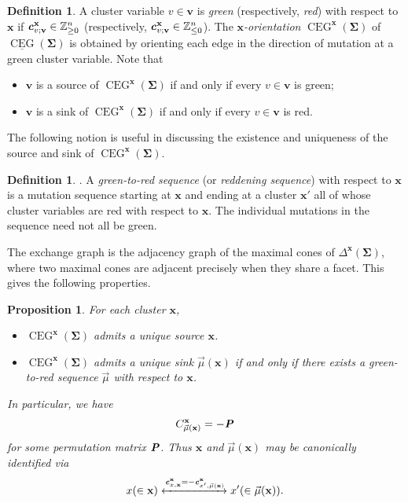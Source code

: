 \documentclass[11pt,reqno]{amsart}
\providecommand{\xlongleftrightarrow}[2][]{\xleftrightarrow[#1]{#2}}
\theoremstyle{plain}
\newtheorem{proposition}[theorem]{Proposition}
\theoremstyle{definition}
\newtheorem{definition}[theorem]{Definition}
\numberwithin{equation}{section}
\newcommand\ZZ{\mathbb{Z}}
\newcommand\<{\langle}
\renewcommand\>{\rangle}
\newcommand{\CEG}{\operatorname{CEG}} %
\newcommand{\uCEG}{\underline{\CEG}} %
\def\vv{\mathbf{v}}
\def\fan{\Delta}
\newcommand{\bfit}[1]{\textbf{\textit{#1}}}
\def\seeds{\mathbf{\Sigma}}
\def\xx{\mathbf{x}}%
\def\cvec{\bfit{c}}
\def\Cmat{{C}}
\newcommand{\DT}[1]{#1^{\vee}}
\def\ZZp{\ZZ_{\ge0}}
\def\ZZm{\ZZ_{\le0}}
\begin{document}
\begin{definition}\label{def:green}
A cluster variable $v\in\vv$ is \emph{green} (respectively, \emph{red}) with respect to $\xx$ if $\cvec^{\xx}_{v;\vv}\in\ZZp^n$ (respectively, $\cvec^{\xx}_{v;\vv}\in\ZZm^n$).
The \emph{$\xx$-orientation} $\CEG^\xx(\seeds)$ of $\uCEG(\seeds)$ is obtained by orienting each edge in the direction of mutation at a green cluster variable.
Note that
\begin{itemize}
    \item {$\vv$ is a source of $\CEG^\xx(\seeds)$ if and only if every $v\in\vv$ is green;}
    \item {$\vv$ is a sink of $\CEG^\xx(\seeds)$ if and only if every $v\in\vv$ is red.}
\end{itemize}
\end{definition}

The following notion is useful in discussing the existence and uniqueness of the source and sink of $\CEG^\xx(\seeds)$.

\begin{definition}\cite[Def.~3.1.1]{Mul}.
A \emph{green-to-red sequence} (or \emph{reddening sequence}) with respect to $\xx$ is a mutation sequence starting at $\xx$ and ending at a cluster $\xx'$ all of whose cluster variables are red with respect to $\xx$. 
The individual mutations in the sequence need not all be green.
\end{definition}

The exchange graph is the adjacency graph of the maximal 
cones of $\fan^\xx(\seeds)$, where two maximal cones are adjacent precisely when they share a facet. This gives the following properties.

\begin{proposition}\label{prop:ss}
For each cluster $\xx$,
\begin{itemize}
    \item $\CEG^\xx(\seeds)$ admits a unique source $\xx$.
    \item $\CEG^\xx(\seeds)$ admits a unique sink $\Vec{\mu}(\xx)$ if and only if there exists a green-to-red sequence $\Vec{\mu}$ with respect to $\xx$.
\end{itemize}
In particular, we have
\begin{gather}\label{eq:C-C-dual0}
    \Cmat^\xx_{\Vec{\mu}(\xx)}=-\bfit{P}
\end{gather}
for some permutation matrix $\bfit{P}$.
Thus $\xx$ and $\Vec{\mu}(\xx)$ may be canonically identified via
\begin{gather}\label{eq:id-CC}
  x(\in\xx)
  \xlongleftrightarrow{\cvec^\xx_{x,\xx}=-\cvec^\xx_{x',\Vec{\mu}(\xx)}}
  x'(\in\Vec{\mu}(\xx)).
\end{gather}
\end{proposition}
\end{document}
